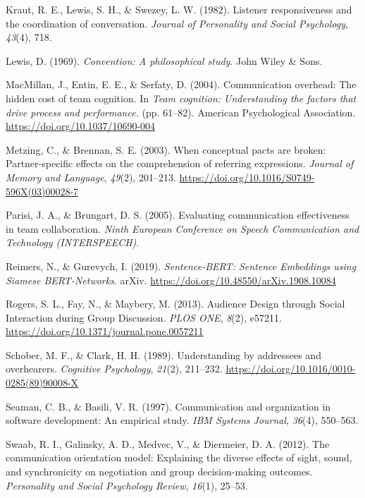 \documentclass[
  english,
]{article}
\newlength{\cslhangindent}
\newenvironment{CSLReferences}[2] %
{\begin{list}{}{%
			\setlength{\itemindent}{0pt}
			\setlength{\leftmargin}{0pt}
			\setlength{\parsep}{0pt}
			\ifodd #1
			\setlength{\leftmargin}{\cslhangindent}
			\setlength{\itemindent}{-1\cslhangindent}
			\fi
			\setlength{\itemsep}{#2\baselineskip}}}
	{\end{list}}
\begin{document}
\begin{CSLReferences}{1}{0}
Kraut, R. E., Lewis, S. H., \& Swezey, L. W. (1982). Listener responsiveness and the coordination of conversation. \emph{Journal of Personality and Social Psychology}, \emph{43}(4), 718.

Lewis, D. (1969). \emph{Convention: A philosophical study}. John Wiley \& Sons.

MacMillan, J., Entin, E. E., \& Serfaty, D. (2004). Communication overhead: {The} hidden cost of team cognition. In \emph{Team cognition: {Understanding} the factors that drive process and performance.} (pp. 61--82). American Psychological Association. \url{https://doi.org/10.1037/10690-004}

Metzing, C., \& Brennan, S. E. (2003). When conceptual pacts are broken: {Partner-specific} effects on the comprehension of referring expressions. \emph{Journal of Memory and Language}, \emph{49}(2), 201--213. \url{https://doi.org/10.1016/S0749-596X(03)00028-7}

Parisi, J. A., \& Brungart, D. S. (2005). Evaluating communication effectiveness in team collaboration. \emph{Ninth European Conference on Speech Communication and Technology (INTERSPEECH)}.

Reimers, N., \& Gurevych, I. (2019). \emph{Sentence-{BERT}: {Sentence Embeddings} using {Siamese BERT-Networks}}. {arXiv}. \url{https://doi.org/10.48550/arXiv.1908.10084}

Rogers, S. L., Fay, N., \& Maybery, M. (2013). Audience {Design} through {Social Interaction} during {Group Discussion}. \emph{PLOS ONE}, \emph{8}(2), e57211. \url{https://doi.org/10.1371/journal.pone.0057211}

Schober, M. F., \& Clark, H. H. (1989). Understanding by addressees and overhearers. \emph{Cognitive Psychology}, \emph{21}(2), 211--232. \url{https://doi.org/10.1016/0010-0285(89)90008-X}

Seaman, C. B., \& Basili, V. R. (1997). Communication and organization in software development: An empirical study. \emph{IBM Systems Journal}, \emph{36}(4), 550--563.

Swaab, R. I., Galinsky, A. D., Medvec, V., \& Diermeier, D. A. (2012). The communication orientation model: Explaining the diverse effects of sight, sound, and synchronicity on negotiation and group decision-making outcomes. \emph{Personality and Social Psychology Review}, \emph{16}(1), 25--53.


\end{CSLReferences}
\end{document}
